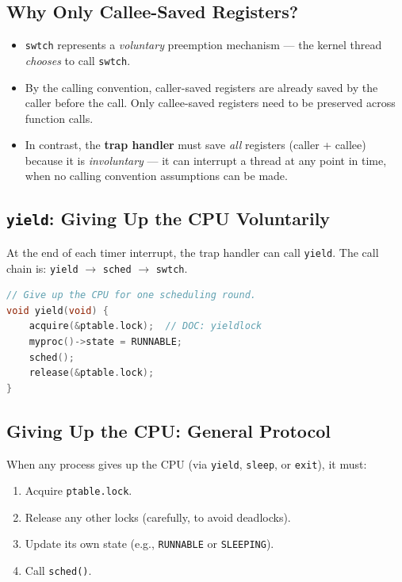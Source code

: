 \documentclass[11pt]{article}
\begin{document}
\subsection{Why Only Callee-Saved Registers?}

\begin{itemize}
    \item \texttt{swtch} represents a \emph{voluntary} preemption mechanism --- the kernel thread \emph{chooses} to call \texttt{swtch}.
    \item By the calling convention, caller-saved registers are already saved by the caller before the call. Only callee-saved registers need to be preserved across function calls.
    \item In contrast, the \textbf{trap handler} must save \emph{all} registers (caller + callee) because it is \emph{involuntary} --- it can interrupt a thread at any point in time, when no calling convention assumptions can be made.
\end{itemize}

\subsection{\texttt{yield}: Giving Up the CPU Voluntarily}

At the end of each timer interrupt, the trap handler can call \texttt{yield}. The call chain is: \texttt{yield} $\to$ \texttt{sched} $\to$ \texttt{swtch}.

\begin{lstlisting}[language=C, caption={yield() in proc.c}]
// Give up the CPU for one scheduling round.
void yield(void) {
    acquire(&ptable.lock);  // DOC: yieldlock
    myproc()->state = RUNNABLE;
    sched();
    release(&ptable.lock);
}
\end{lstlisting}

\subsection{Giving Up the CPU: General Protocol}

When any process gives up the CPU (via \texttt{yield}, \texttt{sleep}, or \texttt{exit}), it must:

\begin{enumerate}
    \item Acquire \texttt{ptable.lock}.
    \item Release any other locks (carefully, to avoid deadlocks).
    \item Update its own state (e.g., \texttt{RUNNABLE} or \texttt{SLEEPING}).
    \item Call \texttt{sched()}.
\end{enumerate}
\end{document}
